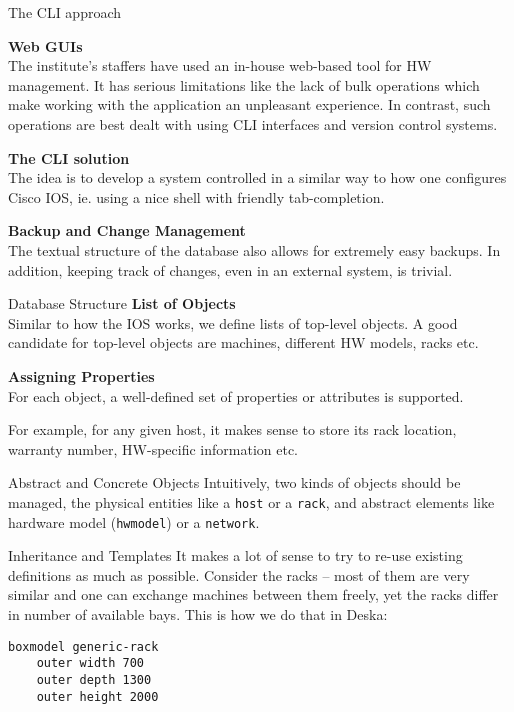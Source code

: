 \documentclass{beamer}
\newcommand{\Heading}[1]{\hskip1cm\textbf{#1}\\}
\begin{document}
\begin{frame}[fragile]
\begin{columns}[t]
\begin{column}{.48\linewidth}
\begin{block}{The CLI approach}

\Heading{Web GUIs}
The institute's staffers have used an in-house web-based tool for HW management.
It has serious limitations like the lack of \alert{bulk operations} which make
working with the application an unpleasant experience.  In contrast, such
operations are best dealt with using \alert{CLI interfaces} and \alert{version
control systems}.

\Heading{The CLI solution}
The idea is to develop a system controlled in a similar way to how one
configures Cisco IOS, ie. using a nice \alert{shell} with friendly
\alert{tab-completion}.

\Heading{Backup and Change Management}
The \alert{textual structure} of the database also allows for extremely easy
backups.  In addition, keeping track of changes, even in an external system, is
trivial.
\end{block}

\begin{block}{Database Structure}
\Heading{List of Objects}
Similar to how the IOS works, we define \alert{lists} of \alert{top-level
objects}.  A good candidate for top-level objects are \alert{machines},
\alert{different HW models}, \alert{racks} etc.

\Heading{Assigning Properties}
For each object, a well-defined set of \alert{properties} or \alert{attributes}
is supported.

For example, for any given \alert{host}, it makes sense to store its \alert{rack
location}, \alert{warranty number}, \alert{HW-specific information} etc.
\end{block}

\begin{block}{Abstract and Concrete Objects}
Intuitively, two kinds of objects should be managed, the \alert{physical}
entities like a {\tt host} or a {\tt rack}, and \alert{abstract} elements like
\alert{hardware model} ({\tt hwmodel}) or a {\tt network}.
\end{block}

\begin{block}{Inheritance and Templates}
It makes a lot of sense to try to re-use existing definitions as much as
possible.  Consider the racks -- most of them are very similar and one can
exchange machines between them freely, yet the racks differ in number of
available bays.  This is how we do that in Deska:

\begin{lstlisting}
boxmodel generic-rack
    outer width 700
    outer depth 1300
    outer height 2000


\end{lstlisting}
\end{block}
\end{column}
\end{columns}
\end{frame}
\end{document}
